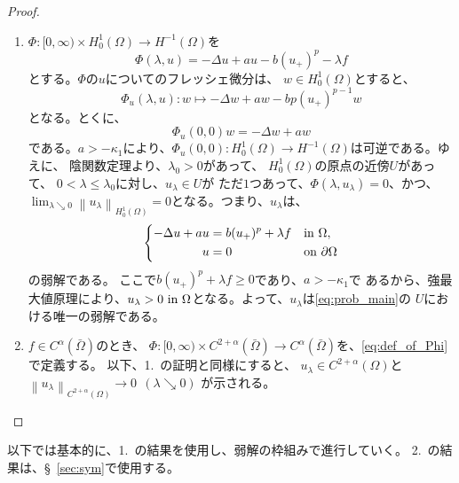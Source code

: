 \begin{proof}
 \begin{enumerate}[1.]
  \item $\Phi \colon [0,\infty) \times H^1_0 (\Omega) \to H^{-1}(\Omega)$を
        \begin{equation}
         \Phi (\lambda, u) = -\Delta u + au - b (u_{+})^p - \lambda f
          \label{eq:def_of_Phi}
        \end{equation}
        とする。$\Phi$の$u$についてのフレッシェ微分は、
        $w \in H^1_0(\Omega)$とすると、
        \[
         \Phi_u (\lambda, u) \colon w \mapsto -\Delta w + aw - b p(u_+)^{p-1} w
        \]
        となる。とくに、
        \[
         \Phi_u (0, 0) w = -\Delta w + aw 
        \]
        である。$a > -\kappa_1$により、$\Phi_u(0,0) \colon
        H^1_0(\Omega) \to H^{-1} (\Omega)$は可逆である。ゆえに、
        陰関数定理より、$\lambda_0 > 0$があって、
        $H_0^1(\Omega)$の原点の近傍$U$があって、
        $0 < \lambda \leq \lambda_0$に対し、$u_\lambda \in U$が
        ただ$1$つあって、$\Phi(\lambda, u_\lambda) = 0$、かつ、
        $\lim_{\lambda \searrow 0} \left\| u_\lambda \right\|_{H^1_0(\Omega)} =
        0$となる。つまり、$u_\lambda$は、
        \begin{align}
         \left\{
         \begin{aligned}
           -\Delta u + a u &= b (u_+)^p + \lambda f  & &\text{in}~ \Omega,  \\
           u &= 0 & &\text{on}~ \partial\Omega
         \end{aligned}
         \right. \label{eq:prob_lem_ifthm}
        \end{align}
        の弱解である。
        ここで$b (u_+)^p + \lambda f \geq 0$であり、$a > -\kappa_1$で
        あるから、強最大値原理により、$u_\lambda > 0 ~\text{in}~
        \Omega$となる。よって、$u_\lambda$は\ref{eq:prob_main}の
        $U$における唯一の弱解である。
  \item $f \in C^\alpha(\bar{\Omega})$のとき、
        $\Phi \colon [0,\infty) \times C^{2+\alpha} (\bar{\Omega})
        \to C^\alpha(\bar{\Omega})$を、\eqref{eq:def_of_Phi}で定義する。
        以下、1.~の証明と同様にすると、
        $u_\lambda \in
        C^{2+\alpha}(\Omega)$と
        $\left\| u_\lambda
        \right\|_{C^{2+\alpha}(\Omega)} \to 0 \ \ (\lambda \searrow
        0)$
        が示される。\qedhere
 \end{enumerate}
\end{proof}

以下では基本的に、1.~の結果を使用し、弱解の枠組みで進行していく。
2.~の結果は、\S~\ref{sec:sym}で使用する。

